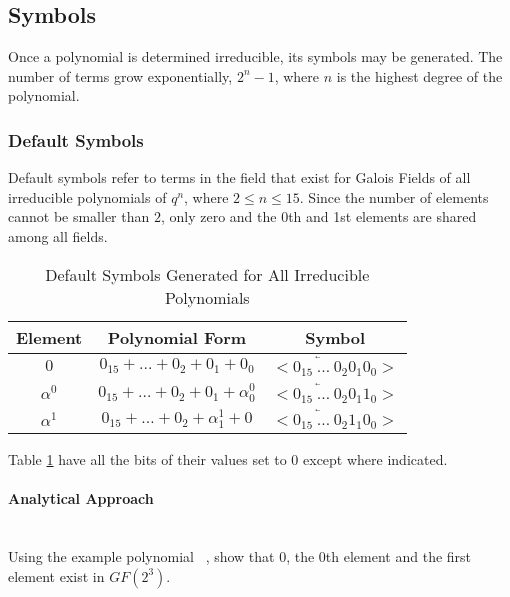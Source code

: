 \subsection{Symbols}

    Once a polynomial is determined irreducible, its symbols may be generated.
    The number of terms grow exponentially, $2^{n}-1$, where $n$ is the highest
    degree of the polynomial.

    \subsubsection{Default Symbols}

    Default symbols refer to terms in the field that exist for Galois Fields of
    all irreducible polynomials of $q^n$, where $2 \leq n
    \leq 15$. Since the number of elements cannot be smaller than $2$, only
    zero and the 0th and 1st elements are shared among all fields.

    \begin{table}[h]
        \def\arraystretch{2.5}
        \caption{Default Symbols Generated for All Irreducible Polynomials}
        \centering
        \begin{tabular*}{300pt}{@{\extracolsep{\fill}} ccc}

        \textbf{Element} & \textbf{Polynomial Form} & \textbf{Symbol}
        \\
        \hline $0$ & $0_{15} + \ldots + 0_{2} + 0_{1} + 0_{0}$ & $<
        \overleftarrow{0_{15} \ \ldots \ 0_{2}} 0_{1} 0_{0} >$ \\

        $\alpha^{0}$ & $0_{15} + \ldots + 0_{2} + 0_{1} + \alpha^{0}_{0}$ &
        $<\overleftarrow{0_{15} \ \ldots \ 0_{2}} 0_{1} 1_{0} >$ \\

        $\alpha^{1}$ & $0_{15} + \ldots + 0_{2} + \alpha^{1}_{1} + 0$ &
        $<\overleftarrow{0_{15} \ \ldots \ 0_{2}} 1_{1} 0_{0} >$ \\

        \end{tabular*}
        \label{table:default_sym}
    \end{table}

    Table \ref{table:default_sym} have all the bits of their values set to $0$
    except where indicated.

        \paragraph{Analytical Approach} \leavevmode\\ Using the example
        polynomial \examplepoly~, show that 0, the 0th element and the first
        element exist in $GF(2^{3})$.

